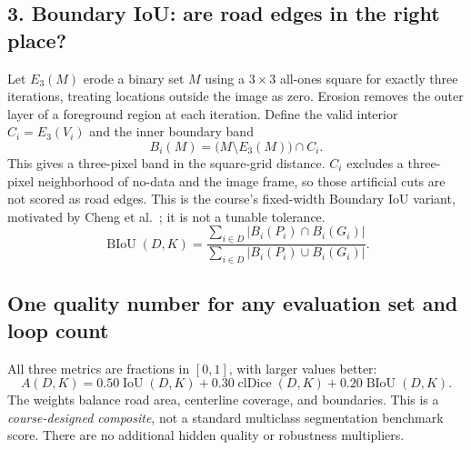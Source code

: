 \documentclass[11pt,letterpaper]{article}
\begin{document}
\subsection{3. Boundary IoU: are road edges in the right place?}
Let $E_3(M)$ erode a binary set $M$ using a $3\times3$ all-ones square for exactly three iterations, treating locations outside the image as zero. Erosion removes the outer layer of a foreground region at each iteration. Define the valid interior $C_i=E_3(V_i)$ and the inner boundary band
\begin{equation}
 B_i(M)=\bigl(M\setminus E_3(M)\bigr)\cap C_i.
\end{equation}
This gives a three-pixel band in the square-grid distance. $C_i$ excludes a three-pixel neighborhood of no-data and the image frame, so those artificial cuts are not scored as road edges. This is the course's fixed-width Boundary IoU variant, motivated by Cheng et al.~\cite{biou}; it is not a tunable tolerance.
\begin{equation}
 \operatorname{BIoU}(D,K)=
 \frac{\sum_{i\in D}|B_i(P_i)\cap B_i(G_i)|}
 {\sum_{i\in D}|B_i(P_i)\cup B_i(G_i)|}.
\end{equation}

\begin{center}
\end{center}

\subsection{One quality number for any evaluation set and loop count}
All three metrics are fractions in $[0,1]$, with larger values better:
\begin{equation}
 \boxed{A(D,K)=0.50\operatorname{IoU}(D,K)+0.30\operatorname{clDice}(D,K)+0.20\operatorname{BIoU}(D,K).}\label{eq:quality}
\end{equation}
The weights balance road area, centerline coverage, and boundaries. This is a \emph{course-designed composite}, not a standard multiclass segmentation benchmark score. There are no additional hidden quality or robustness multipliers.
\end{document}

